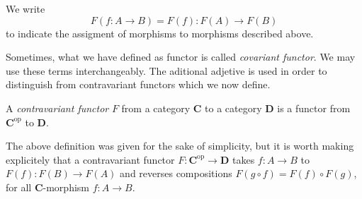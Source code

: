 \begin{remark}
    We write \[F(f\colon A\to B) = F(f): F(A)\to F(B)\]
    to indicate the assigment of morphisms to morphisms described above.
\end{remark}

Sometimes, what we have defined as functor is called \textit{covariant functor}. We may use these terms  interchangeably. The aditional adjetive is used in order to distinguish from contravariant functors which we now define.

\begin{definition}
A \textit{contravariant functor} \(F\)  from a category \(\mathbf{C}\) to a category \(\mathbf{D}\) is a functor from  \(\mathbf{C}^{\text{op}}\) to \(\mathbf{D}\). 
\end{definition}

The above definition was given for the sake of simplicity, but it is worth making explicitely  that a contravariant functor \(F\colon \mathbf{C}^{\text{op}}\to \mathbf{D}\) takes \(f\colon A\to B\) to \(F(f) \colon F(B)\to F(A)\) and reverses compositions  \(F(g\circ f) = F(f)\circ F(g)\), for all \(\mathbf{C}\)-morphism \(f\colon A\to B\).

